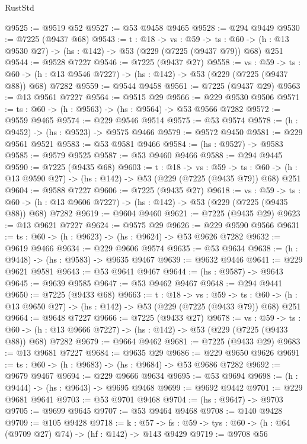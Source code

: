\begin{lexlean}{RustStd}
\begin{coremodule}
@9525 := @9519 @52
@9527 := @53 @9458 @9465
@9528 := @294 @9449
@9530 := @7225 (@9437 @68)
@9543 := {t : @18} ->
  {vs : @59} ->
  {ts : @60} -> (h : @13 @9530 @27) -> (hs : @142) -> @53 (@229 (@7225 (@9437 @79)) @68) @251
@9544 := @9528 @7227
@9546 := @7225 (@9437 @27)
@9558 := {vs : @59} ->
  {ts : @60} -> (h : @13 @9546 @7227) -> (hs : @142) -> @53 (@229 (@7225 (@9437 @88)) @68) @7282
@9559 := @9544 @9458
@9561 := @7225 (@9437 @29)
@9563 := @13 @9561 @7227
@9564 := @9515 @29
@9566 := @229 @9530 @9506
@9571 := {ts : @60} -> (h : @9563) -> (hs : @9564) -> @53 @9566 @7282
@9572 := @9559 @9465
@9574 := @229 @9546 @9514
@9575 := @53 @9574
@9578 := (h : @9452) -> (hs : @9523) -> @9575 @9466
@9579 := @9572 @9450
@9581 := @229 @9561 @9521
@9583 := @53 @9581 @9466
@9584 := (hs : @9527) -> @9583
@9585 := @9579 @9525
@9587 := @53 @9460 @9466
@9588 := @294 @9445
@9590 := @7225 (@9435 @68)
@9603 := {t : @18} ->
  {vs : @59} ->
  {ts : @60} -> (h : @13 @9590 @27) -> (hs : @142) -> @53 (@229 (@7225 (@9435 @79)) @68) @251
@9604 := @9588 @7227
@9606 := @7225 (@9435 @27)
@9618 := {vs : @59} ->
  {ts : @60} -> (h : @13 @9606 @7227) -> (hs : @142) -> @53 (@229 (@7225 (@9435 @88)) @68) @7282
@9619 := @9604 @9460
@9621 := @7225 (@9435 @29)
@9623 := @13 @9621 @7227
@9624 := @9575 @29
@9626 := @229 @9590 @9566
@9631 := {ts : @60} -> (h : @9623) -> (hs : @9624) -> @53 @9626 @7282
@9632 := @9619 @9466
@9634 := @229 @9606 @9574
@9635 := @53 @9634
@9638 := (h : @9448) -> (hs : @9583) -> @9635 @9467
@9639 := @9632 @9446
@9641 := @229 @9621 @9581
@9643 := @53 @9641 @9467
@9644 := (hs : @9587) -> @9643
@9645 := @9639 @9585
@9647 := @53 @9462 @9467
@9648 := @294 @9441
@9650 := @7225 (@9433 @68)
@9663 := {t : @18} ->
  {vs : @59} ->
  {ts : @60} -> (h : @13 @9650 @27) -> (hs : @142) -> @53 (@229 (@7225 (@9433 @79)) @68) @251
@9664 := @9648 @7227
@9666 := @7225 (@9433 @27)
@9678 := {vs : @59} ->
  {ts : @60} -> (h : @13 @9666 @7227) -> (hs : @142) -> @53 (@229 (@7225 (@9433 @88)) @68) @7282
@9679 := @9664 @9462
@9681 := @7225 (@9433 @29)
@9683 := @13 @9681 @7227
@9684 := @9635 @29
@9686 := @229 @9650 @9626
@9691 := {ts : @60} -> (h : @9683) -> (hs : @9684) -> @53 @9686 @7282
@9692 := @9679 @9467
@9694 := @229 @9666 @9634
@9695 := @53 @9694
@9698 := (h : @9444) -> (hs : @9643) -> @9695 @9468
@9699 := @9692 @9442
@9701 := @229 @9681 @9641
@9703 := @53 @9701 @9468
@9704 := (hs : @9647) -> @9703
@9705 := @9699 @9645
@9707 := @53 @9464 @9468
@9708 := @140 @9428
@9709 := @105 @9428
@9718 := {k : @57} ->
  {fs : @59} -> {tys : @60} -> (h : @64 (@9709 @27) @74) -> (hf : @142) -> @143 @9429
@9719 := @9708 @56

\end{coremodule}
\end{lexlean}
